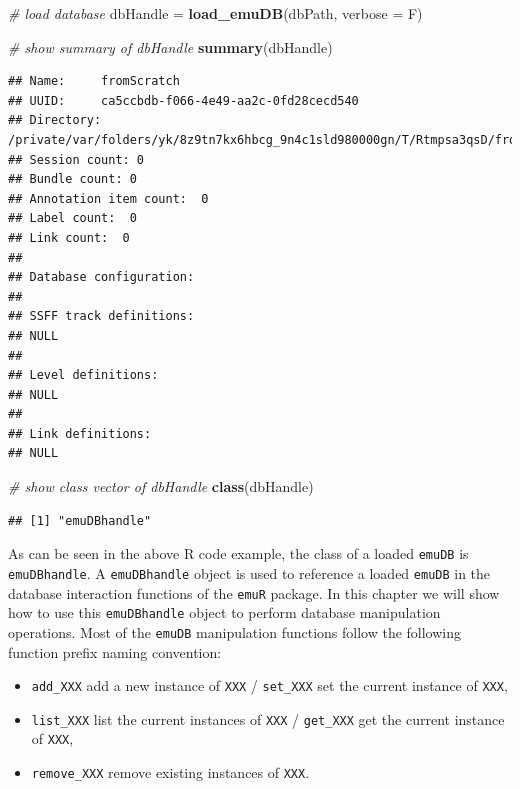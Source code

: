 \documentclass[]{book}
\newenvironment{Shaded}{\begin{snugshade}}{\end{snugshade}}
\newcommand{\CommentTok}[1]{\textcolor[rgb]{0.56,0.35,0.01}{\textit{#1}}}
\newcommand{\DataTypeTok}[1]{\textcolor[rgb]{0.13,0.29,0.53}{#1}}
\newcommand{\KeywordTok}[1]{\textcolor[rgb]{0.13,0.29,0.53}{\textbf{#1}}}
\newcommand{\NormalTok}[1]{#1}
\newcommand{\StringTok}[1]{\textcolor[rgb]{0.31,0.60,0.02}{#1}}
\providecommand{\tightlist}{%
  \setlength{\itemsep}{0pt}\setlength{\parskip}{0pt}}
\begin{document}
\begin{Shaded}
\begin{Highlighting}[]
\CommentTok{# load database}
\NormalTok{dbHandle =}\StringTok{ }\KeywordTok{load_emuDB}\NormalTok{(dbPath, }\DataTypeTok{verbose =}\NormalTok{ F)}

\CommentTok{# show summary of dbHandle}
\KeywordTok{summary}\NormalTok{(dbHandle)}
\end{Highlighting}
\end{Shaded}

\begin{verbatim}
## Name:     fromScratch 
## UUID:     ca5ccbdb-f066-4e49-aa2c-0fd28cecd540 
## Directory:    /private/var/folders/yk/8z9tn7kx6hbcg_9n4c1sld980000gn/T/Rtmpsa3qsD/fromScratch_emuDB 
## Session count: 0 
## Bundle count: 0 
## Annotation item count:  0 
## Label count:  0 
## Link count:  0 
## 
## Database configuration:
## 
## SSFF track definitions:
## NULL
## 
## Level definitions:
## NULL
## 
## Link definitions:
## NULL
\end{verbatim}

\begin{Shaded}
\begin{Highlighting}[]
\CommentTok{# show class vector of dbHandle}
\KeywordTok{class}\NormalTok{(dbHandle)}
\end{Highlighting}
\end{Shaded}

\begin{verbatim}
## [1] "emuDBhandle"
\end{verbatim}

As can be seen in the above R code example, the class of a loaded \texttt{emuDB} is \texttt{emuDBhandle}. A \texttt{emuDBhandle} object is used to reference a loaded \texttt{emuDB} in the database interaction functions of the \texttt{emuR} package. In this chapter we will show how to use this \texttt{emuDBhandle} object to perform database manipulation operations. Most of the \texttt{emuDB} manipulation functions follow the following function prefix naming convention:

\begin{itemize}
\tightlist
\item
  \texttt{add\_XXX} add a new instance of \texttt{XXX} / \texttt{set\_XXX} set the current instance of \texttt{XXX},
\item
  \texttt{list\_XXX} list the current instances of \texttt{XXX} / \texttt{get\_XXX} get the current instance of \texttt{XXX},
\item
  \texttt{remove\_XXX} remove existing instances of \texttt{XXX}.
\end{itemize}
\end{document}

